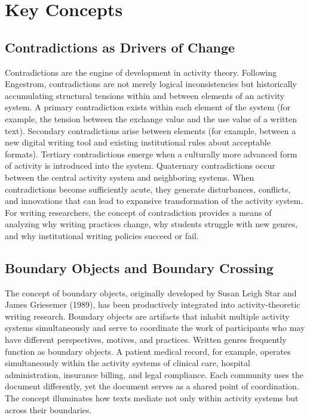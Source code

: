 \documentclass[12pt]{article}
\begin{document}
\section{Key Concepts}

\subsection{Contradictions as Drivers of Change}

Contradictions are the engine of development in activity theory. Following Engestrom, contradictions are not merely logical inconsistencies but historically accumulating structural tensions within and between elements of an activity system. A primary contradiction exists within each element of the system (for example, the tension between the exchange value and the use value of a written text). Secondary contradictions arise between elements (for example, between a new digital writing tool and existing institutional rules about acceptable formats). Tertiary contradictions emerge when a culturally more advanced form of activity is introduced into the system. Quaternary contradictions occur between the central activity system and neighboring systems. When contradictions become sufficiently acute, they generate disturbances, conflicts, and innovations that can lead to expansive transformation of the activity system. For writing researchers, the concept of contradiction provides a means of analyzing why writing practices change, why students struggle with new genres, and why institutional writing policies succeed or fail.

\subsection{Boundary Objects and Boundary Crossing}

The concept of boundary objects, originally developed by Susan Leigh Star and James Griesemer (1989), has been productively integrated into activity-theoretic writing research. Boundary objects are artifacts that inhabit multiple activity systems simultaneously and serve to coordinate the work of participants who may have different perspectives, motives, and practices. Written genres frequently function as boundary objects. A patient medical record, for example, operates simultaneously within the activity systems of clinical care, hospital administration, insurance billing, and legal compliance. Each community uses the document differently, yet the document serves as a shared point of coordination. The concept illuminates how texts mediate not only within activity systems but across their boundaries.
\end{document}

